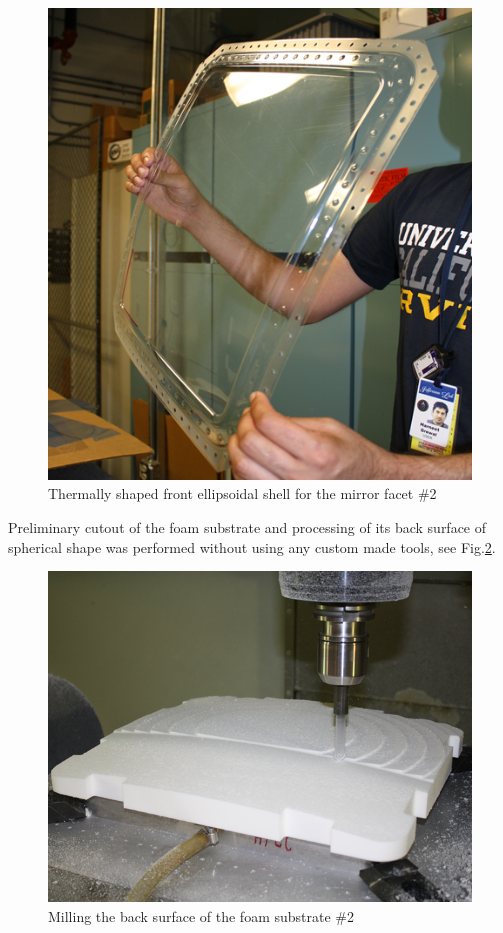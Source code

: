 \begin{figure}[ht]
    \centering
    \includegraphics[width=0.90\linewidth]{images/Front_Shell.png}
    \caption{Thermally shaped front ellipsoidal shell for the mirror facet \#2}
    \label{fig:Shell}
\end{figure}

Preliminary cutout of the foam substrate and processing of its back surface of spherical shape was performed without using any custom made tools, see Fig.\ref{fig:Cut_Substr}.
\begin{figure}[ht]
    \centering
    \includegraphics[width=0.9\linewidth]{images/Cut_Substr.png}
    \caption{Milling the back surface of the foam substrate \#2}
    \label{fig:Cut_Substr}
\end{figure}

